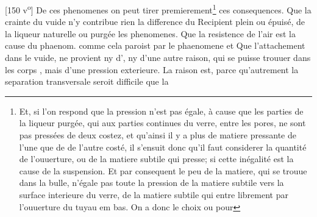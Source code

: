 [150 v\textsuperscript{o}] De ces phenomenes on peut tirer premierement\footnote{Et, si l'on respond que la pression n'est pas \'{e}gale, \`{a} cause que les parties de la liqueur purg\'{e}e\protect{}, qui  aux parties continues du verre, entre les pores, ne sont pas press\'{e}es de deux costez, et qu'ainsi il y a plus de matiere pressante de l'une que de de l'autre cost\'{e}, il s'ensuit donc qu'il faut considerer la quantit\'{e} de l'ouuerture, ou de la matiere subtile\protect{} qui presse; si cette in\'{e}galit\'{e} est la cause de la suspension. Et par consequent le peu de la matiere, qui se trouue dans la bulle, n'\'{e}gale pas toute la pression de la matiere subtile vers la surface interieure du verre, de la matiere subtile qui entre librement par l'ouuerture du tuyau em bas. On a donc le choix ou pour}  ces consequences.\pend \pstart {} Que la crainte du vuide\protect{} n'y contribue rien  la difference du Recipient plein ou \'{e}puis\'{e}, de la liqueur naturelle ou purg\'{e}e\protect{}  les phenomenes.\pend \pstart {} Que la resistence de l'air est la cause du phaenom.  comme cela paroist par le phaenomene  et \pend \pstart {} Que l'attachement  dans le vuide\protect{}, ne provient ny d', ny d'une autre raison, qui se puisse trouuer dans les corps , mais d'une pression exterieure. La raison  est, parce qu'autrement la separation transversale  seroit  difficile que la 